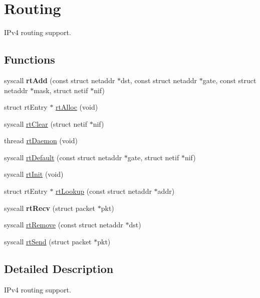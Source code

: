 \hypertarget{group__route}{\section{Routing}
\label{group__route}
}


I\-Pv4 routing support.  


\subsection*{Functions}
\begin{DoxyCompactItemize}
\item 
\hypertarget{group__route_gad348910a2738a2ca30993ff80b827ab4}{syscall {\bfseries rt\-Add} (const struct netaddr $\ast$dst, const struct netaddr $\ast$gate, const struct netaddr $\ast$mask, struct netif $\ast$nif)}\label{group__route_gad348910a2738a2ca30993ff80b827ab4}

\item 
struct rt\-Entry $\ast$ \hyperlink{group__route_ga26315014ba6d7fad7b8a8269883fd739}{rt\-Alloc} (void)
\item 
syscall \hyperlink{group__route_gaef6ef2733013310153fb0f411f7ca484}{rt\-Clear} (struct netif $\ast$nif)
\item 
thread \hyperlink{group__route_ga0e9fb2f9786ebb4480a14a7d2093e42b}{rt\-Daemon} (void)
\item 
syscall \hyperlink{group__route_gadf87830e6f85b4123e2e4e966903f545}{rt\-Default} (const struct netaddr $\ast$gate, struct netif $\ast$nif)
\item 
syscall \hyperlink{group__route_gac078a09e86b39ea1a7a371a0f6df220d}{rt\-Init} (void)
\item 
struct rt\-Entry $\ast$ \hyperlink{group__route_gab76f7d53028b4526bf2f53fc91c3be11}{rt\-Lookup} (const struct netaddr $\ast$addr)
\item 
\hypertarget{group__route_ga1a30ae6d86be9258f5945bb8e405f859}{syscall {\bfseries rt\-Recv} (struct packet $\ast$pkt)}\label{group__route_ga1a30ae6d86be9258f5945bb8e405f859}

\item 
syscall \hyperlink{group__route_ga0077b85fb29ad23488f9fc98bd7ac8ac}{rt\-Remove} (const struct netaddr $\ast$dst)
\item 
syscall \hyperlink{group__route_gadf7133a34e4fbe8d1f4f4ea013d8fa77}{rt\-Send} (struct packet $\ast$pkt)
\end{DoxyCompactItemize}


\subsection{Detailed Description}
I\-Pv4 routing support. 

